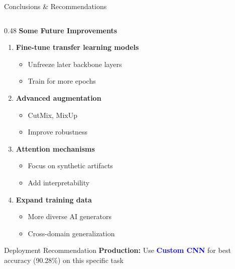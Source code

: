 \documentclass[aspectratio=169]{beamer}
\begin{document}
\begin{frame}{Conclusions \& Recommendations}
\begin{columns}[T]
        \begin{column}{0.48\textwidth}
            \textbf{Some Future Improvements}
            \begin{enumerate}
                \scriptsize
                \item \textbf{Fine-tune transfer learning models}
                    \begin{itemize}
                        \scriptsize
                        \item Unfreeze later backbone layers
                        \item Train for more epochs
                    \end{itemize}
                \item \textbf{Advanced augmentation}
                    \begin{itemize}
                        \scriptsize
                        \item CutMix, MixUp
                        \item Improve robustness
                    \end{itemize}
                \item \textbf{Attention mechanisms}
                    \begin{itemize}
                        \scriptsize
                        \item Focus on synthetic artifacts
                        \item Add interpretability
                    \end{itemize}
                \item \textbf{Expand training data}
                    \begin{itemize}
                        \scriptsize
                        \item More diverse AI generators
                        \item Cross-domain generalization
                    \end{itemize}
            \end{enumerate}
            
            \vspace{-0.2cm}
            \begin{block}{Deployment Recommendation}
                \textbf{Production:} Use \textcolor{blue}{\textbf{Custom CNN}} for best accuracy (90.28\%) on this specific task
            \end{block}
        \end{column}
    \end{columns}
\end{frame}
\end{document}
